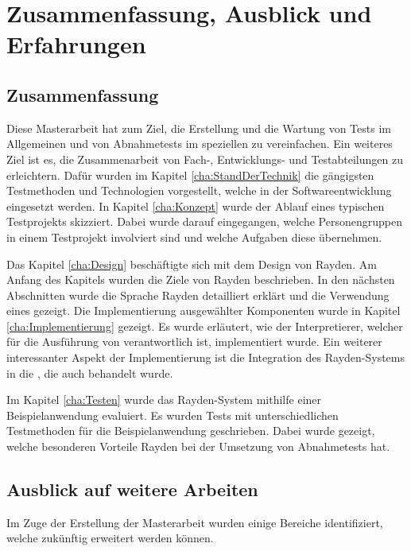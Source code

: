 \chapter{Zusammenfassung, Ausblick und Erfahrungen}
\label{cha:Zusammenfassung}

\section{Zusammenfassung}
Diese Masterarbeit hat zum Ziel, die Erstellung und die Wartung von Tests im Allgemeinen und von Abnahmetests im speziellen zu vereinfachen. Ein weiteres Ziel ist es, die Zusammenarbeit von Fach-, Entwicklungs- und Testabteilungen zu erleichtern. Dafür wurden im Kapitel \ref{cha:StandDerTechnik} die gängigsten Testmethoden und Technologien vorgestellt, welche in der Softwareentwicklung eingesetzt werden. In Kapitel \ref{cha:Konzept} wurde der Ablauf eines typischen Testprojekts skizziert. Dabei wurde darauf eingegangen, welche Personengruppen in einem Testprojekt involviert sind und welche Aufgaben diese übernehmen. 

\SuperPar
Das Kapitel \ref{cha:Design} beschäftigte sich mit dem Design von Rayden. Am Anfang des Kapitels wurden die Ziele von Rayden beschrieben. In den nächsten Abschnitten wurde die Sprache Rayden detailliert erklärt und die Verwendung eines  gezeigt. Die Implementierung ausgewählter Komponenten wurde in Kapitel \ref{cha:Implementierung} gezeigt. Es wurde erläutert, wie der Interpretierer, welcher für die Ausführung von  verantwortlich ist, implementiert wurde. Ein weiterer interessanter Aspekt der Implementierung ist die Integration des Rayden-Systems in die , die auch behandelt wurde. 

\SuperPar
Im Kapitel \ref{cha:Testen} wurde das Rayden-System mithilfe einer Beispielanwendung evaluiert. Es wurden Tests mit unterschiedlichen Testmethoden für die Beispielanwendung geschrieben. Dabei wurde gezeigt, welche besonderen Vorteile Rayden bei der Umsetzung von Abnahmetests hat.

\pagebreak
\section{Ausblick auf weitere Arbeiten}

Im Zuge der Erstellung der Masterarbeit wurden einige Bereiche identifiziert, welche zukünftig erweitert werden können.\\

